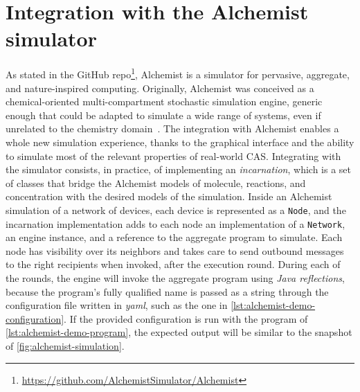 \section{Integration with the Alchemist simulator}

As stated in the GitHub repo\footnote{\url{https://github.com/AlchemistSimulator/Alchemist}}, Alchemist is a simulator for pervasive, aggregate, and nature-inspired computing.
%
Originally, Alchemist was conceived as a chemical-oriented multi-compartment stochastic simulation engine, generic enough that could be adapted to simulate a wide range of systems, even if unrelated to the chemistry domain~\cite{alchemist}.
%
The integration with Alchemist enables a whole new simulation experience, thanks to the graphical interface and the ability to simulate most of the relevant properties of real-world \ac{CAS}.
%
Integrating with the simulator consists, in practice, of implementing an \textit{incarnation}, which is a set of classes that bridge the Alchemist models of molecule, reactions, and concentration with the desired models of the simulation.
%
Inside an Alchemist simulation of a network of devices, each device is represented as a \texttt{Node}, and the incarnation implementation adds to each node an implementation of a \texttt{Network}, an engine instance, and a reference to the aggregate program to simulate.
%
Each node has visibility over its neighbors and takes care to send outbound messages to the right recipients when invoked, after the execution round.
%
During each of the rounds, the engine will invoke the aggregate program using \textit{Java reflections}, because the program's fully qualified name is passed as a string through the configuration file written in \textit{yaml}, such as the one in \cref{lst:alchemist-demo-configuration}.
%
If the provided configuration is run with the program of \cref{lst:alchemist-demo-program}, the expected output will be similar to the snapshot of \cref{fig:alchemist-simulation}.





